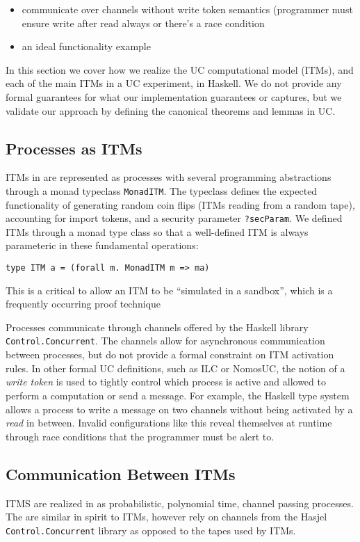\begin{itemize}
\item communicate over channels without write token semantics (programmer must ensure write after read always or there's a race condition
\item an ideal functionality example  
\end{itemize}

In this section we cover how we realize the UC computational model (ITMs), and each of the main ITMs in a UC experiment, in Haskell.
We do not provide any formal guarantees for what our implementation guarantees or captures, but we validate our approach by defining the canonical theorems and lemmas in UC.

\subsection{Processes as ITMs}
ITMs in \us are represented as processes with several programming abstractions through a monad typeclass \texttt{MonadITM}.
The typeclass defines the expected functionality of generating random coin flips (ITMs reading from a random tape), accounting for import tokens, and a security parameter \texttt{?secParam}.
We defined ITMs through a monad type class so that a well-defined ITM is always parameteric in these fundamental operations:
\begin{lstlisting}
type ITM a = (forall m. MonadITM m => ma)
\end{lstlisting}
This is a critical to allow an ITM to be ``simulated in a sandbox'', which is a frequently occurring proof technique 

Processes communicate through channels offered by the Haskell library \texttt{Control.Concurrent}.
The channels allow for asynchronous communication between processes, but do not provide a formal constraint on ITM activation rules.
In other formal UC definitions, such as ILC or NomosUC, the notion of a \emph{write token} is used to tightly control which process is active and allowed to perform a computation or send a message.
For example, the Haskell type system allows a process to write a message on two channels without being activated by a \emph{read} in between. 
Invalid configurations like this reveal themselves at runtime through race conditions that the programmer must be alert to.



\subsection{Communication Between ITMs}
ITMS are realized in \us as probabilistic, polynomial time, channel passing processes. 
The are similar in spirit to ITMs, however rely on channels from the Hasjel \texttt{Control.Concurrent} library as opposed to the tapes used by ITMs. 

